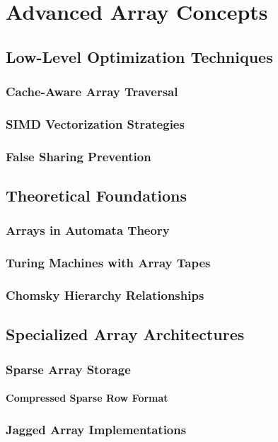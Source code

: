 \documentclass[12pt, oneside]{book}
\begin{document}
	 \part{Advanced Array Concepts}
	 \chapter{Low-Level Optimization Techniques}
	 \section{Cache-Aware Array Traversal}
	 \section{SIMD Vectorization Strategies}
	 \section{False Sharing Prevention}
	 
	 \chapter{Theoretical Foundations}
	 \section{Arrays in Automata Theory}
	 \section{Turing Machines with Array Tapes}
	 \section{Chomsky Hierarchy Relationships}
	 
	 \chapter{Specialized Array Architectures}
	 \section{Sparse Array Storage}
	 \subsection{Compressed Sparse Row Format}
	 \section{Jagged Array Implementations}
\end{document}

